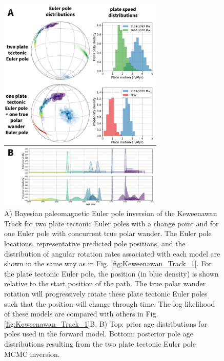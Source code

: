 \documentclass[]{agujournal2019}
\begin{document}
\begin{figure}
\centering
\includegraphics[width=0.7\textwidth]{fig_Keweenawan_2.pdf}
\caption{A) Bayesian paleomagnetic Euler pole inversion of the Keweenawan Track for two plate tectonic Euler poles with a change point and for one Euler pole with concurrent true polar wander. The Euler pole locations, representative predicted pole positions, and the distribution of angular rotation rates associated with each model are shown in the same way as in Fig. \ref{fig:Keweenawan_Track_1}. For the plate tectonic Euler pole, the position (in blue density) is shown relative to the start position of the path. The true polar wander rotation will progressively rotate these plate tectonic Euler poles such that the position will change through time. The log likelihood of these models are compared with others in Fig. \ref{fig:Keweenawan_Track_1}B. B) Top: prior age distributions for poles used in the forward model. Bottom: posterior pole age distributions resulting from the two plate tectonic Euler pole MCMC inversion.}
\label{fig:Keweenawan_Track_2}
\end{figure}
\end{document}
